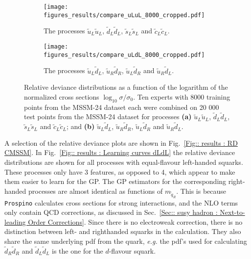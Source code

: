 \documentclass[twoside,english]{uiofysmaster}
\begin{document}
\begin{figure}
    \centering
    \begin{subfigure}[b]{0.9\textwidth}
        \texttt{[image: figures\_results/compare\_uLuL\_8000\_cropped.pdf]}
        \caption{The processes $\tilde{u}_L \tilde{u}_L$, $\tilde{d}_L \tilde{d}_L$, $\tilde{s}_L \tilde{s}_L$ and $\tilde{c}_L \tilde{c}_L$.}
        \label{Fig:: results : RD MSSM-24 uLuL}
    \end{subfigure}
    \begin{subfigure}[b]{0.9\textwidth}
        \texttt{[image: figures\_results/compare\_uLdL\_8000\_cropped.pdf]}
        \caption{The processes $\tilde{u}_L\tilde{d}_L$, $\tilde{u}_R\tilde{d}_R$, $\tilde{u}_L\tilde{d}_R$ and $\tilde{u}_R\tilde{d}_L$.}
        \label{Fig :: results : RD MSSM-24 uLdL}
    \end{subfigure}
    \caption{Relative deviance distributions as a function of the logarithm of the normalized cross sections $\log_{10} \sigma / \sigma_0$. Ten experts with 8000 training points from the MSSM-24 dataset each were combined on 20 000 test points from the MSSM-24 dataset for processes \textbf{(a)}  $\tilde{u}_L \tilde{u}_L$, $\tilde{d}_L \tilde{d}_L$, $\tilde{s}_L \tilde{s}_L$ and $\tilde{c}_L \tilde{c}_L$; and \textbf{(b)} $\tilde{u}_L\tilde{d}_L$, $\tilde{u}_R\tilde{d}_R$, $\tilde{u}_L\tilde{d}_R$ and $\tilde{u}_R\tilde{d}_L$. }
\label{Fig:: results : RD MSSM-24}
\end{figure}

A selection of the relative deviance plots are shown in Fig.~\ref{Fig:: results : RD CMSSM}. In Fig.~\ref{Fig:: results : Learning curves dLdL} the relative deviance distributions are shown for all processes with equal-flavour left-handed squarks. These processes only have 3 features, as opposed to 4, which appear to make them easier to learn for the GP. The GP estimators for the corresponding right-handed processes are almost identical as functions of $m_{\tilde{q}_R}$. This is because \verb|Prospino| calculates cross sections for strong interactions, and the NLO terms only contain QCD corrections, as discussed in Sec.~\ref{Sec:: susy hadron : Next-to-leading Order Corrections}. Since there is no electroweak correction, there is no distinction between left- and righthanded squarks in the calculation. They also share the same underlying pdf from the quark, \textit{e.g.} the pdf's used for calculating $\tilde{d}_R \tilde{d}_R$ and $\tilde{d}_L \tilde{d}_L$ is the one for the $d$-flavour squark.
\end{document}
